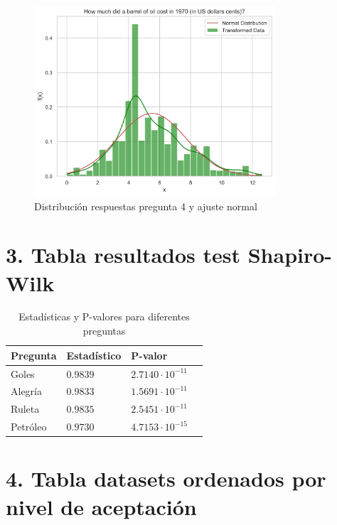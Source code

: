 \begin{figure}[h]
\centering
    \includegraphics[width=0.8\textwidth]{figures/appendix_2/oil_distribution_normal.png}
\caption{Distribución respuestas pregunta 4 y ajuste normal}
\end{figure}

\FloatBarrier
 
\section*{3. Tabla resultados test Shapiro-Wilk}
 \label{appendix3}
 
\begin{table}[h]
\centering
    \caption{Estadísticas y P-valores para diferentes preguntas}
    \label{tab:stats}
\begin{tabularx}{\textwidth}{l X X X}
\toprule
\textbf{Pregunta} & \textbf{Estadístico} & \textbf{P-valor} \\
\midrule
Goles    & $0.9839$ & $2.7140 \cdot 10^{-11}$ \\
Alegría  & $0.9833$ & $1.5691 \cdot 10^{-11}$ \\
Ruleta   & $0.9835$ & $2.5451 \cdot 10^{-11}$ \\
Petróleo & $0.9730$ & $4.7153 \cdot 10^{-15}$ \\
\bottomrule
\end{tabularx}
\end{table}

\FloatBarrier

\section*{4. Tabla datasets ordenados por nivel de aceptación}
 \label{appendix4}

